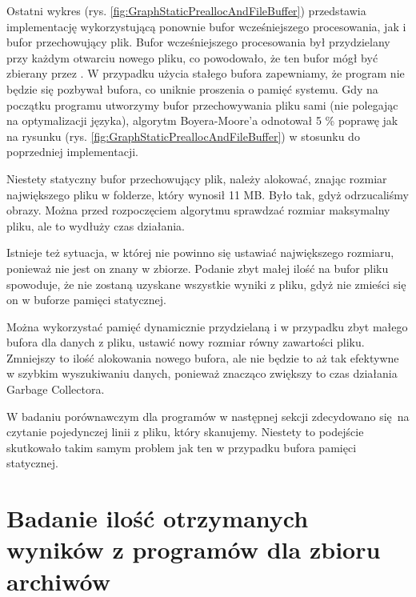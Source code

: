 Ostatni wykres (rys. \ref{fig:GraphStaticPreallocAndFileBuffer}) przedstawia implementację
wykorzystującą ponownie bufor wcześniejszego procesowania, jak i bufor przechowujący plik.
Bufor wcześniejszego procesowania był przydzielany przy każdym otwarciu nowego pliku,
co powodowało, że ten bufor mógł być zbierany przez .
W przypadku użycia stałego bufora zapewniamy, że program nie będzie się pozbywał
bufora, co uniknie proszenia o pamięć systemu. Gdy na początku programu utworzymy
bufor przechowywania pliku sami (nie polegając na optymalizacji języka), algorytm Boyera-Moore'a
odnotował 5 \% poprawę jak na rysunku (rys. \ref{fig:GraphStaticPreallocAndFileBuffer}) w stosunku do poprzedniej implementacji.

Niestety statyczny bufor przechowujący plik, należy alokować, znając rozmiar 
największego pliku w folderze, który wynosił 11 MB. Było tak, gdyż odrzucaliśmy
obrazy. Można przed rozpoczęciem algorytmu sprawdzać rozmiar maksymalny 
pliku, ale to wydłuży czas działania.

Istnieje też sytuacja, w której nie powinno się ustawiać największego rozmiaru, ponieważ nie
jest on znany w zbiorze. Podanie zbyt małej ilość na bufor pliku spowoduje,
że nie zostaną uzyskane wszystkie wyniki z pliku, gdyż nie zmieści się on w buforze pamięci statycznej.

Można wykorzystać pamięć dynamicznie przydzielaną i w przypadku zbyt małego 
bufora dla danych z pliku, ustawić nowy rozmiar równy zawartości pliku.
Zmniejszy to ilość alokowania nowego bufora, ale nie będzie to aż tak efektywne
w szybkim wyszukiwaniu danych, ponieważ znacząco zwiększy to czas działania
Garbage Collectora.

W badaniu porównawczym dla programów w następnej sekcji zdecydowano się na
czytanie pojedynczej linii z pliku, który skanujemy. Niestety to podejście
skutkowało takim samym problem jak ten w przypadku bufora pamięci statycznej.

\section{Badanie ilość otrzymanych wyników z programów dla zbioru archiwów}

